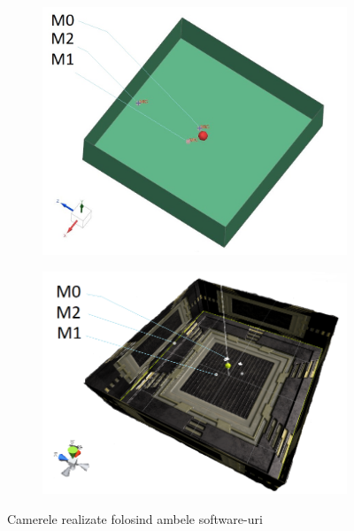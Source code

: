 	\begin{figure}[!htb]%
		\begin{subfigure}[b]{.48\textwidth}
			\centering
			\includegraphics[width=1\linewidth]{imagini/room_view.jpg} 
		\end{subfigure}
		\hfill
		\begin{subfigure}[b]{.48\textwidth}
			\centering
			\includegraphics[width=1\linewidth]{imagini/room.png}
		\end{subfigure}
		
		\caption{Camerele realizate folosind ambele software-uri}
		\label{asemanatoare}	
	\end{figure}

